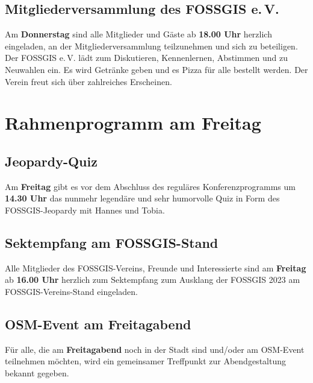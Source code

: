 \subsection*{Mitgliederversammlung des FOSSGIS e.\,V.}
Am {\bfseries Donnerstag} sind alle Mitglieder und Gäste ab {\bfseries 18.00 Uhr} herzlich eingeladen, an der Mitgliederversammlung teilzunehmen und sich zu beteiligen. Der FOSSGIS e.\,V. lädt zum Diskutieren, Kennenlernen, Abstimmen und zu Neuwahlen ein. Es wird Getränke geben und es Pizza für alle bestellt werden. Der Verein freut sich über zahlreiches Erscheinen.

\section*{Rahmenprogramm am Freitag}
\subsection*{Jeopardy-Quiz}
Am {\bfseries Freitag} gibt es vor dem Abschluss des reguläres Konferenzprogramms um {\bfseries 14.30 Uhr} das nunmehr legendäre und sehr humorvolle Quiz in Form des FOSSGIS-Jeopardy mit Hannes und Tobia.

\subsection*{Sektempfang am FOSSGIS-Stand}
Alle Mitglieder des FOSSGIS-Vereins, Freunde und Interessierte sind am {\bfseries Freitag} ab {\bfseries 16.00 Uhr} herzlich zum Sektempfang zum Ausklang der FOSSGIS 2023 am FOSSGIS-Vereins-Stand eingeladen.

\subsection*{OSM-Event am Freitagabend}
Für alle, die am {\bfseries Freitagabend} noch in der Stadt sind und/oder am OSM-Event teilnehmen möchten, wird ein gemeinsamer Treffpunkt zur Abendgestaltung bekannt gegeben.

\newpage
\label{platinsposoren}

\newpage

\newpage

\newpage

\newpage

\newpage


